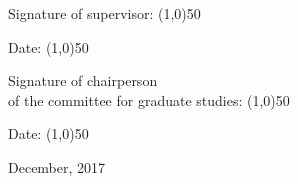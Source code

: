 \documentclass[ twoside, 12pt ]{article}
\begin{document}
\begin{titlepage}
\begin{center}
        \begin{minipage}{0.4\textwidth}
        \end{minipage}
        
        \begin{minipage}{0.8\textwidth}
            \begin{flushleft}
                Signature of supervisor: \line(1,0){50}
            \end{flushleft}
        \end{minipage}
        \begin{minipage}{0.19\textwidth}
            \begin{flushright}
                Date: \line(1,0){50}
            \end{flushright}
        \end{minipage}
        
        \begin{minipage}{0.4\textwidth}
        \end{minipage}
        
        \begin{minipage}{0.8\textwidth}
            \begin{flushleft}
                Signature of chairperson\\
                of the committee for graduate studies: \line(1,0){50}
            \end{flushleft}
        \end{minipage}
        \begin{minipage}{0.19\textwidth}
            \begin{flushright}
                Date: \line(1,0){50}
            \end{flushright}
        \end{minipage}
        
        \begin{minipage}{0.4\textwidth}
        \end{minipage}
        
        \vspace{2cm}
        December, 2017 \\[1.5cm]
        
        
        
        
    \end{center}
\end{titlepage}
\end{document}
